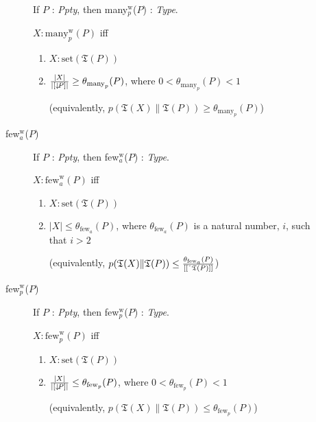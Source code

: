 \begin{description}
\begin{description}
  If $P$ : \textit{Ppty}, then many$_p^{\text{w}}$($P$) :
  \textit{Type}.

  $X:\text{many}_p^{\text{w}}(P)$ iff
\begin{enumerate} 
 
\item $X:\mathrm{set}(\mathfrak{T}(P))$ 
 
\item $\frac{|X|}{|[\downarrow\!P]|}\geq\theta_{\text{many}_p}(P)$, where
  $0<\theta_{\text{many}_p}(P)<1$

  (equivalently, $p(\mathfrak{T}(X)\|\mathfrak{T}(P))\geq\theta_{\text{many}_p}(P)$)
 
\end{enumerate}

\item[\textnormal{few$_a^{\text{w}}$($P$)}] \mbox{}

  If $P$ : \textit{Ppty}, then few$_a^{\text{w}}$($P$) :
  \textit{Type}.

  $X:\text{few}_a^{\text{w}}(P)$ iff
\begin{enumerate} 
 
\item $X:\mathrm{set}(\mathfrak{T}(P))$ 
 
\item $|X|\leq\theta_{\text{few}_a}(P)$, where
  $\theta_{\text{few}_a}(P)$ is a natural number, $i$, such that $i>2$

  (equivalently, $p(\mathfrak{T}(X)\|\mathfrak{T}(P))\leq\frac{\theta_{\text{few}_a}(P)}{[[\ \!\check{}\ \!\mathfrak{T}(P)]]}$)
 
\end{enumerate}

\item[\textnormal{few$_p^{\text{w}}$($P$)}] \mbox{}

  If $P$ : \textit{Ppty}, then few$_p^{\text{w}}$($P$) :
  \textit{Type}.

  $X:\text{few}_p^{\text{w}}(P)$ iff
\begin{enumerate} 
 
\item $X:\mathrm{set}(\mathfrak{T}(P))$ 
 
\item $\frac{|X|}{|[\downarrow\!P]|}\leq\theta_{\text{few}_p}(P)$, where
  $0<\theta_{\text{few}_p}(P)<1$

  (equivalently, $p(\mathfrak{T}(X)\|\mathfrak{T}(P))\leq\theta_{\text{few}_p}(P)$)
 
\end{enumerate}  


\end{description}
\end{description}
